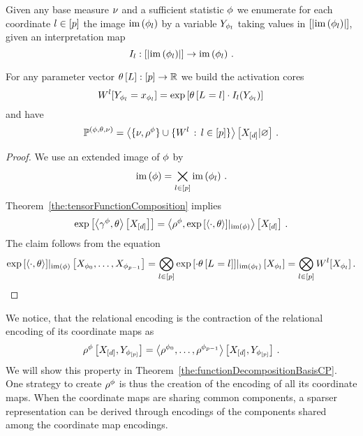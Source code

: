 \begin{theorem}
    \label{def:expFamilyTensorRep}
    Given any base measure $\nu$ and a sufficient statistic $\phi$ we enumerate for each coordinate $l\in[p]$ the image $\mathrm{im}\left(\phi_{l}\right)$ by a variable $Y_{\phi_{l}}$ taking values in $[\left|\mathrm{im}\left(\phi_{l}\right)\right|]$, given an interpretation map
    \[ I_{l} :
    [\left|\mathrm{im}\left(\phi_{l}\right)\right|] \rightarrow \mathrm{im}\left(\phi_{l}\right) \, . \]

    For any parameter vector $\theta\left[L\right]:[p]\rightarrow\mathbb{R}$ we build the activation cores
    \[ W^{l}[Y_{\phi_{l}}=x_{\phi_{l}}]
    = \mathrm{exp}\left[\theta\left[L_{}=l_{}\right] \cdot I_{l}(Y_{\phi_{l}}) \right] \,   \]
    and have
    \[ \mathbb{P}^{(\phi,\theta,\nu)} =
    \left\langle \{\nu,\rho^{\phi}\}\cup\{W^{l} \, : \, l\in[p]\}\right\rangle \left[ X_{[d]} | \varnothing \right] \, .
    \]
\end{theorem}
\begin{proof}
    We use an extended image of $\phi$ by  %
    \[ \mathrm{im}\left(\phi\right) = \bigtimes_{l\in[p]} \mathrm{im}\left(\phi_{l}\right) \, . \]
    Theorem~\ref{the:tensorFunctionComposition} implies
    \[ \mathrm{exp}\left[\left\langle \gamma^{\phi},\theta\right\rangle \left[ X_{[d]} \right]\right]
    = \left\langle \rho^{\phi}, {\mathrm{exp}\left[\braket{\cdot, \theta}\right]}|_{\mathrm{im}\left(\phi\right)}\right\rangle \left[ X_{[d]} \right] \, . \]
    The claim follows from the equation
    \[ {\mathrm{exp}\left[\braket{\cdot, \theta}\right]}|_{\mathrm{im}\left(\phi\right)}\left[X_{\phi_{0}},\ldots,X_{\phi_{p-1}}\right]
    = \bigotimes_{l\in[p]} {\mathrm{exp}\left[\cdot \theta\left[L_{}=l_{}\right]\right]}|_{\mathrm{im}\left(\phi_{l}\right)}\left[X_{\phi_{l}}\right]
    = \bigotimes_{l\in[p]} W^{l}[X_{\phi_{l}}] \, . \]
\end{proof}


We notice, that the relational encoding is the contraction of the relational encoding of its coordinate maps as
\[ \rho^{\phi}\left[X_{[d]},Y_{\phi_{[p]}}\right] = \left\langle \rho^{\phi_{0}},\ldots,\rho^{\phi_{p-1}}\right\rangle \left[ X_{[d]},Y_{\phi_{[p]}} \right] \, .  \]
We will show this property in Theorem~\ref{the:functionDecompositionBasisCP}.
One strategy to create $\rho^{\phi}$ is thus the creation of the encoding of all its coordinate maps.
When the coordinate maps are sharing common components, a sparser representation can be derived through encodings of the components shared among the coordinate map encodings.



